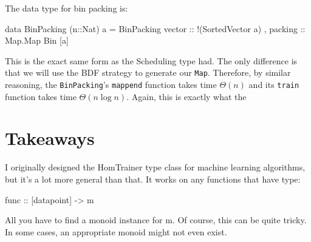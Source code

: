 \documentclass[tikz]{tmr}
\newcommand\h{\lstinline}
\newcommand\+{\mdoubleplus}
\begin{document}
\begin{figure}[H]
\begin{tikzpicture}
\end{tikzpicture}
\vspace{0.05in}
\end{figure}

The data type for bin packing is:
\begin{spec}
data BinPacking (n::Nat) a = BinPacking
    { vector  :: !(SortedVector a)
    , packing :: Map.Map Bin [a]
    }
\end{spec}
This is the exact same form as the Scheduling type had.
The only difference is that we will use the BDF strategy to generate our \h{Map}.
Therefore, by similar reasoning, the \h{BinPacking}'s \h{mappend} function takes time $\Theta(n)$ and its \h{train} function takes time $\Theta(n\log n)$.
Again, this is exactly what the 

\section{Takeaways}

I originally designed the HomTrainer type class for machine learning algorithms, but it's a lot more general than that.
It works on any functions that have type:
\begin{spec}
func :: [datapoint] -> m
\end{spec}
All you have to find a monoid instance for m.
Of course, this can be quite tricky.
In some cases, an appropriate monoid might not even exist.

% 

\end{document}
